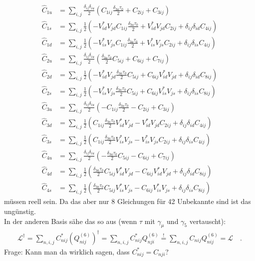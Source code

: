 \documentclass[a4,11pt]{article}
\begin{document}
\begin{align*}
	\hat{C}_{1u} &= \sum_{i,j} \frac{\delta_{ij}\delta_{iu}}{2}\left(C_{1ij}\frac{\delta_{3a}\tau_{0}}{2}+ 
	C_{2ij} + C_{3ij}\right) \\
	\hat{C}_{1s} &= \sum_{i,j}\frac{1}{2}\left(- V_{id}^*V_{jd}C_{1ij}\frac{\delta_{3a}\tau_{0}}{2}+ V_{id}^*V_{jd}C_{2ij}+ \delta_{ij}\delta_{id}C_{4ij}\right) \\
	\hat{C}_{1d} &= \sum_{i,j}\frac{1}{2}\left(- V_{is}^*V_{js}C_{1ij}\frac{\delta_{3a}\tau_{0}}{2}+ V_{is}^*V_{js}C_{2ij}+ \delta_{ij}\delta_{is}C_{4ij}\right) \\
	\hat{C}_{2u} &= \sum_{i,j}\frac{\delta_{ij}\delta_{iu}}{2}\left(\frac{\delta_{3a}\tau_{0}}{2}C_{5ij}+ 
	C_{6ij} + C_{7ij}\right) \\
	\hat{C}_{2d} &= \sum_{i,j}\frac{1}{2}\left(- V_{id}^*V_{jd}\frac{\delta_{3a}\tau_{0}}{2}C_{5ij} + C_{6ij}V_{id}^*V_{jd} + \delta_{ij}\delta_{id}C_{8ij}\right) \\
	\hat{C}_{2s} &= \sum_{i,j}\frac{1}{2}\left(- V_{is}^*V_{js}\frac{\delta_{3a}\tau_{0}}{2}C_{5ij} + C_{6ij}V_{is}^*V_{js} + \delta_{ij}\delta_{is}C_{8ij}\right) \\
	\hat{C}_{3u} &= \sum_{i,j}\frac{\delta_{ij}\delta_{iu}}{2}\left(- C_{1ij}\frac{\delta_{3a}\tau_{0}}{2} - C_{2ij} + C_{3ij}\right) \\
	\hat{C}_{3d} &= \sum_{i,j}\frac{1}{2}\left(C_{1ij}\frac{\delta_{3a}\tau_{0}}{2} V_{id}^*V_{jd} - V_{id}^*V_{jd}C_{2ij} + \delta_{ij}\delta_{id}C_{4ij}\right) \\
	\hat{C}_{3s} &= \sum_{i,j}\frac{1}{2}\left(C_{1ij}\frac{\delta_{3a}\tau_{0}}{2} V_{is}^*V_{js} - V_{is}^*V_{js}C_{2ij} + \delta_{ij}\delta_{is}C_{4ij}\right) \\
	\hat{C}_{4u} &= \sum_{i,j}\frac{\delta_{ij}\delta_{iu}}{2}\left(-\frac{\delta_{3a}\tau_{0}}{2}C_{5ij} - C_{6ij} + C_{7ij}\right) \\
	\hat{C}_{4d} &= \sum_{i,j}\frac{1}{2}\left(\frac{\delta_{3a}\tau_{0}}{2}C_{5ij}V_{id}^*V_{jd} - C_{6ij}V_{id}^*V_{jd} + \delta_{ij}\delta_{id}C_{8ij}\right) \\
	\hat{C}_{4s} &= \sum_{i,j}\frac{1}{2}\left(\frac{\delta_{3a}\tau_{0}}{2}C_{5ij}V_{is}^*V_{js} - C_{6ij}V_{is}^*V_{js} + \delta_{ij}\delta_{is}C_{8ij}\right)
\end{align*}
müssen reell sein. Da das aber nur 8 Gleichungen für 42 Unbekannte sind ist das ungünstig. \\
In der anderen Basis sähe das so aus (wenn $\tau$ mit $\gamma_\mu$ und $\gamma_5$ vertauscht):
\begin{align*}
	\mathcal{L}^\dagger = \sum_{n,i,j}C_{nij}^*\left(Q^{(6)}_{nij}\right)^\dagger = \sum_{n,i,j}C_{nij}^*Q^{(6)}_{nji} \overset{!}{=} \sum_{n,i,j}C_{nij}Q^{(6)}_{nij} = \mathcal{L} \quad.
\end{align*}
Frage: Kann man da wirklich sagen, dass $C_{nij}^* = C_{nji}$?
\end{document}
